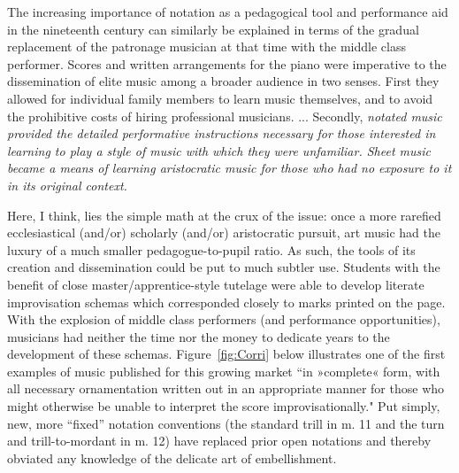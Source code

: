         \begin{smallquote}
            The increasing importance of notation as a pedagogical tool and performance aid in the nineteenth century can similarly be explained in terms of the gradual replacement of the patronage musician at that time with the middle class performer. Scores and written arrangements for the piano were imperative to the dissemination of elite music among a broader audience in two senses. First they allowed for individual family members to learn music themselves, and to avoid the prohibitive costs of hiring professional musicians. ... Secondly, \textit{notated music provided the detailed performative instructions necessary for those interested in learning to play a style of music with which they were unfamiliar. Sheet music became a means of learning aristocratic music for those who had no exposure to it in its original context.\autocite[72]{Moore_1992}}
        \end{smallquote}

    Here, I think, lies the simple math at the crux of the issue: once a more rarefied ecclesiastical (and/or) scholarly (and/or) aristocratic pursuit, art music had the luxury of a much smaller pedagogue-to-pupil ratio. As such, the tools of its creation and dissemination could be put to much subtler use. Students with the benefit of close master/apprentice-style tutelage were able to develop literate improvisation schemas which corresponded closely to marks printed on the page. With the explosion of middle class performers (and performance opportunities), musicians had neither the time nor the money to dedicate years to the development of these schemas. Figure~\ref{fig:Corri} below illustrates one of the first examples of music published for this growing market ``in »complete« form, with all necessary ornamentation written out in an appropriate manner for those who might otherwise be unable to interpret the score improvisationally."\autocite[72]{Moore_1992} Put simply, new, more ``fixed'' notation conventions (the standard trill in m. 11 and the turn and trill-to-mordant in m. 12) have replaced prior open notations and thereby obviated any knowledge of the delicate art of embellishment.

